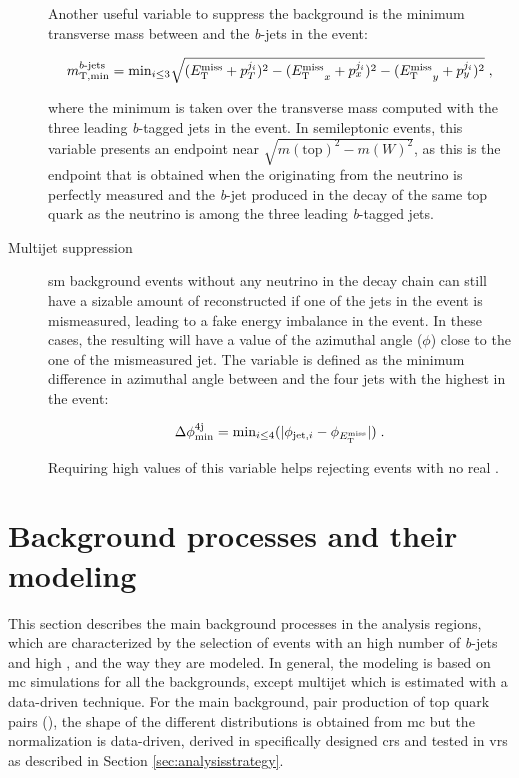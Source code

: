 \begin{description}
Another useful variable to suppress the \ttbar background is the minimum transverse mass between \met and the \textit{b}-jets in the event:

\begin{equation}
m_{\mathrm{T, min}}^{b\textrm{-jets}} =  \mathrm{min}_{i\leq 3}  \sqrt{(E_{\rm T}^{\mathrm{miss}}+p_T^{j_i})^2 - ({E_{\rm T}^{\mathrm{miss}}}_x+p_x^{j_i})^2 - ({E_{\rm T}^{\mathrm{miss}}}_y+p_y^{j_i})^2 } \; , \nonumber
\end{equation}

\noindent where the minimum is taken over the transverse mass computed with the three leading \textit{b}-tagged jets in the event. 
In semileptonic \ttbar events, this variable presents an endpoint near $\sqrt{ m( \mathrm{top})^2 - m(W)^2  }$, 
as this is the endpoint that is obtained when the \met originating from the neutrino is perfectly measured and the \textit{b}-jet produced in the decay of the same top quark as the neutrino is among the three leading \textit{b}-tagged jets. 

\item[Multijet suppression] \gls{sm} background events without any neutrino in the decay chain can still have a sizable amount of reconstructed \met if one of the jets in the 
event is mismeasured, leading to a fake energy imbalance in the event. In these cases, the resulting \met will have a value of the azimuthal angle ($\phi$) close to the one of the mismeasured jet. The variable \dphimin is defined as the minimum difference in azimuthal angle between \met and the  four jets with the highest \pt in the event:

\begin{equation}
\Delta\phi_{\rm{min}}^{4{\rm{j}}} = \textrm{min}_{i \leq 4}(|\phi_{{\rm{jet},}i} - \phi_{E_{\rm T}^{\mathrm{miss}}}|) \; . \nonumber
\end{equation}

\noindent Requiring high values of this variable helps rejecting events with no real \met. 

\end{description}



\section{Background processes and their modeling}
\label{sec:common_backgrounds}

This section describes the main background processes in the analysis regions, 
which are characterized by the selection of events with an high number of \textit{b}-jets and high \met, and the way they are modeled. 
In general, the modeling is based on \gls{mc} simulations for
all the backgrounds, except multijet which is estimated with a data-driven technique.
For the main background, pair production of top quark pairs (\ttbar), the shape of the different distributions is obtained from \gls{mc}
but the normalization is data-driven, derived in specifically designed \glspl{cr} and tested in \glspl{vr} as described in Section \ref{sec:analysisstrategy}.

